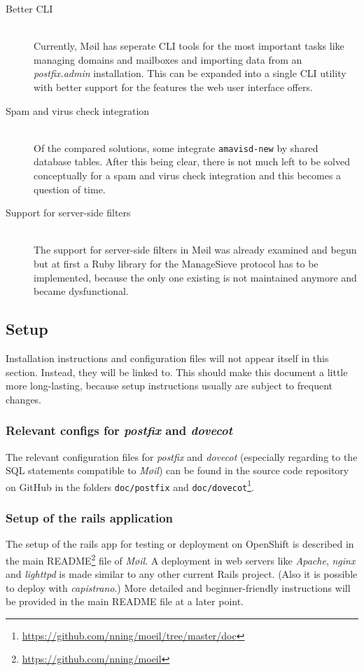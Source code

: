 \documentclass[12pt,a4paper]{scrartcl}
\begin{document}
			\begin{description}
				\item[\rm Better \ac{CLI}]\ \\
					Currently, Møil has seperate \ac{CLI} tools for the most
					important tasks like managing domains and mailboxes and
					importing data from an \emph{postfix.admin} installation.
					This can be expanded into a single \ac{CLI} utility with
					better support for the features the web user interface
					offers.

				\item[\rm Spam and virus check integration]\ \\
					Of the compared solutions, some integrate
					\texttt{amavisd-new} by shared database tables. After this
					being clear, there is not much left to be solved
					conceptually for a spam and virus check integration and
					this becomes a question of time.

				\item[\rm Support for server-side filters]\ \\
					The support for server-side filters in Møil was already
					examined and begun but at first a Ruby library for the
					ManageSieve protocol has to be implemented, because the
					only one existing is not maintained anymore and became
					dysfunctional.
			\end{description}

		\subsection{Setup}
			Installation instructions and configuration files will not appear
			itself in this section. Instead, they will be linked to. This
			should make this document a little more long-lasting, because setup
			instructions usually are subject to frequent changes.

			\subsubsection{Relevant configs for \emph{postfix} and \emph{dovecot}}
				The relevant configuration files for \emph{postfix} and
				\emph{dovecot} (especially regarding to the \ac{SQL} statements
				compatible to \emph{Møil}) can be found in the source code
				repository on GitHub in the folders \texttt{doc/postfix} and
				\texttt{doc/dovecot}\footnote{\url{https://github.com/nning/moeil/tree/master/doc}}.

			\subsubsection{Setup of the rails application}
				The setup of the rails app for testing or deployment on
				OpenShift is described in the main
				README\footnote{\url{https://github.com/nning/moeil}} file of
				\emph{Møil}. A deployment in web servers like \emph{Apache},
				\emph{nginx} and \emph{lighttpd} is made similar to any other
				current \ac{Rails} project. (Also it is possible to deploy with
				\emph{capistrano}.) More detailed and beginner-friendly
				instructions will be provided in the main README file at a
				later point.
\end{document}
